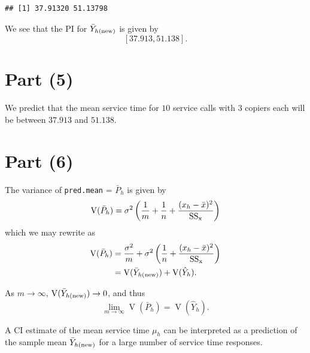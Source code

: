 \documentclass[
]{article}
\begin{document}
\begin{verbatim}
## [1] 37.91320 51.13798
\end{verbatim}

We see that the PI for \(\bar{Y}_{h(\rm{new})}\) is given by \[
  [37.913, 51.138].
\]

\hypertarget{part-5}{%
\section{Part (5)}\label{part-5}}


We predict that the mean service time for \(10\) service calls with
\(3\) copiers each will be between \(37.913\) and \(51.138\).

\hypertarget{part-6}{%
\section{Part (6)}\label{part-6}}


The variance of \texttt{pred.mean} = \(\bar{P}_h\) is given by \[
  \operatorname{V}(\bar{P}_h) = \sigma^2 \left(\frac{1}{m} + \frac{1}{n} + \frac{(x_h-\bar{x})^2}{\rm{SS}_x}\right)
\] which we may rewrite as \begin{align*}
  \operatorname{V}(\bar{P}_h)
    &= \frac{\sigma^2}{m} + \sigma^2\left(\frac{1}{n} + \frac{(x_h-\bar{x})^2}{\rm{SS}_x}\right)\\
    &= \operatorname{V}(\bar{Y}_{h(\rm{new})}) + \operatorname{V}(\hat{Y}_h).
\end{align*}

As \(m \to \infty\), \(\operatorname{V}(\bar{Y}_{h(\rm{new})}) \to 0\),
and thus \[
  \lim_{m \to \infty} \operatorname{V}(\bar{P}_h) = \operatorname{V}(\hat{Y}_h).
\]

A CI estimate of the mean service time \(\mu_h\) can be interpreted as a
prediction of the sample mean \(\bar{Y}_{h(\rm{new})}\) for a large
number of service time responses.
\end{document}
